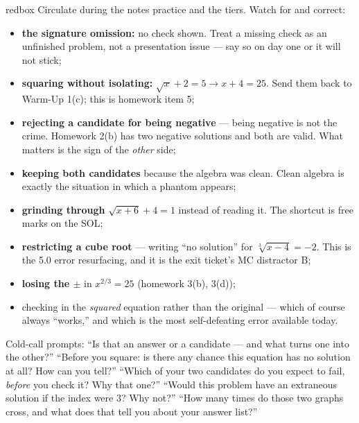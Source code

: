 \documentclass[10pt]{article}
\begin{document}
\begin{skillbox}{redbox}
Circulate during the notes practice and the tiers. Watch for and correct:
\begin{itemize}[leftmargin=1.2em, nosep]
  \item \textbf{the signature omission:} no check shown. Treat a missing check as an unfinished problem, not a presentation issue --- say so on day one or it will not stick;
  \item \textbf{squaring without isolating:} $\sqrt{x}+2=5 \rightarrow x+4=25$. Send them back to Warm-Up 1(c); this is homework item 5;
  \item \textbf{rejecting a candidate for being negative} --- being negative is not the crime. Homework 2(b) has two negative solutions and both are valid. What matters is the sign of the \emph{other} side;
  \item \textbf{keeping both candidates} because the algebra was clean. Clean algebra is exactly the situation in which a phantom appears;
  \item \textbf{grinding through} $\sqrt{x+6}+4=1$ instead of reading it. The shortcut is free marks on the SOL;
  \item \textbf{restricting a cube root} --- writing ``no solution'' for $\sqrt[3]{x-4}=-2$. This is the 5.0 error resurfacing, and it is the exit ticket's MC distractor B;
  \item \textbf{losing the $\pm$} in $x^{2/3}=25$ (homework 3(b), 3(d));
  \item checking in the \emph{squared} equation rather than the original --- which of course always ``works,'' and which is the most self-defeating error available today.
\end{itemize}
Cold-call prompts: ``Is that an answer or a candidate --- and what turns one into the other?''
``Before you square: is there any chance this equation has no solution at all? How can you tell?''
``Which of your two candidates do you expect to fail, \emph{before} you check it? Why that one?''
``Would this problem have an extraneous solution if the index were $3$? Why not?'' ``How many times
do those two graphs cross, and what does that tell you about your answer list?''
\end{skillbox}
\end{document}
